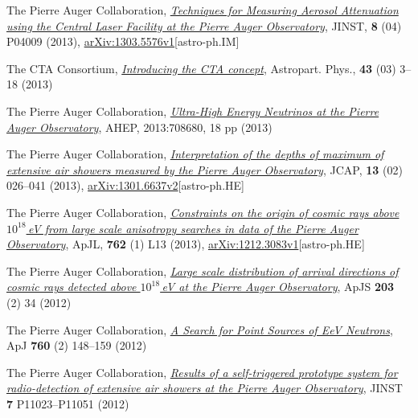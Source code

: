 \begin{etaremune}
\item {}The Pierre Auger Collaboration, \href{http://dx.doi.org/10.1088/1748-0221/8/04/P04009}{\emph{Techniques for Measuring Aerosol Attenuation using the Central Laser Facility at the Pierre Auger Observatory}}, JINST, {\bf{8}} (04) P04009 (2013), \href{http://arxiv.org/abs/1303.5576}{arXiv:1303.5576v1}[astro-ph.IM]

\item {}The CTA Consortium, \href{http://dx.doi.org/10.1016/j.astropartphys.2013.01.007}{\emph{Introducing the CTA concept}}, Astropart. Phys., {\bf{43}} (03) 3--18 (2013)

\item {}The Pierre Auger Collaboration, \href{http://dx.doi.org/10.1155/2013/708680
}{\emph{Ultra-High Energy Neutrinos at the Pierre Auger Observatory}}, AHEP, 2013:708680, 18 pp (2013)

\item {}The Pierre Auger Collaboration, \href{http://dx.doi.org/10.1088/1475-7516/2013/02/026}{\emph{Interpretation of the depths of maximum of extensive air showers measured by the Pierre Auger Observatory}}, JCAP, {\bf{13}} (02) 026--041 (2013), \href{http://arxiv.org/abs/1301.6637}{arXiv:1301.6637v2}[astro-ph.HE]

\item {}The Pierre Auger Collaboration, \href{http://dx.doi.org/10.1088/2041-8205/762/1/L13}{\emph{Constraints on the origin of cosmic rays above $10^{18}$\,eV from large scale anisotropy searches in data of the Pierre Auger Observatory}}, ApJL, {\bf{762}} (1) L13 (2013), \href{http://arxiv.org/abs/1212.3083}{arXiv:1212.3083v1}[astro-ph.HE]

\item {}The Pierre Auger Collaboration,
\href{http://dx.doi.org/10.1088/0067-0049/203/2/34}{\emph{Large scale
distribution of arrival directions of cosmic rays detected above $10^{18}$\,eV
at the Pierre Auger Observatory}}, ApJS {\bf{203}} (2) 34 (2012)

\item {}The Pierre Auger Collaboration,
\href{http://dx.doi.org/10.1088/0004-637X/760/2/148}{\emph{A Search for Point
Sources of EeV Neutrons}}, ApJ {\bf{760}} (2) 148--159 (2012)

\item {}The Pierre Auger Collaboration,
\href{http://dx.doi.org/10.1088/1748-0221/7/11/P11023}{\emph{Results of a
self-triggered prototype system for radio-detection of extensive air showers at
the Pierre Auger Observatory}}, JINST {\bf{7}} P11023--P11051 (2012)


\end{etaremune}

